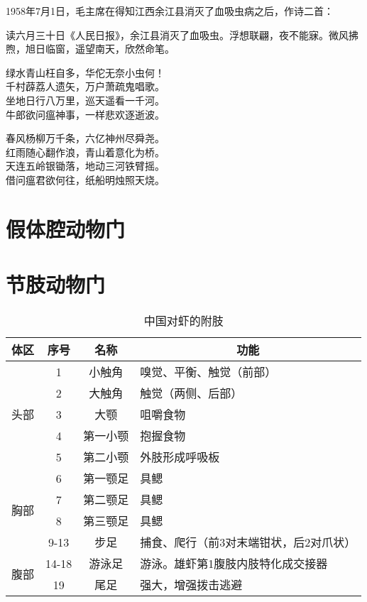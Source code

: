 \begin{gs}
	1958年7月1日，毛主席在得知江西余江县消灭了血吸虫病之后，作诗二首：

	\mbox{}

	\fangsong
	\hspace{2em} 读六月三十日《人民日报》，余江县消灭了血吸虫。浮想联翩，夜不能寐。微风拂煦，旭日临窗，遥望南天，欣然命笔。
	\begin{center}
		\kaishu
		绿水青山枉自多，华佗无奈小虫何！\\
		千村薜荔人遗矢，万户萧疏鬼唱歌。\\
		坐地日行八万里，巡天遥看一千河。\\
		牛郎欲问瘟神事，一样悲欢逐逝波。\\

		\mbox{}

		春风杨柳万千条，六亿神州尽舜尧。\\
		红雨随心翻作浪，青山着意化为桥。\\
		天连五岭银锄落，地动三河铁臂摇。\\
		借问瘟君欲何往，纸船明烛照天烧。\\

	\end{center}
\end{gs}

\section{假体腔动物门}

\section{节肢动物门}

\begin{table}[htbp]
	\centering
	\begin{tabularx}{\textwidth}{|c|c|c|X|}
		\hline
		体区 & 序号 & 名称 & \multicolumn{1}{c|}{功能} \\ \hline
		\multirow{5}{*}{头部} & 1 & 小触角 & 嗅觉、平衡、触觉（前部） \\ \cline{2-4}
		& 2 & 大触角 & 触觉（两侧、后部） \\ \cline{2-4}
		& 3 & 大颚 & 咀嚼食物 \\ \cline{2-4}
		& 4 & 第一小颚 & 抱握食物 \\ \cline{2-4}
		& 5 & 第二小颚 & 外肢形成呼吸板 \\ \hline
		\multirow{4}{*}{胸部} & 6 & 第一颚足 & 具鳃 \\ \cline{2-4}
		& 7 & 第二颚足 & 具鳃 \\ \cline{2-4}
		& 8 & 第三颚足 & 具鳃 \\ \cline{2-4}
		& 9-13 & 步足 & 捕食、爬行（前3对末端钳状，后2对爪状） \\ \hline
		\multirow{2}{*}{腹部} & 14-18 & 游泳足 & 游泳。雄虾第1腹肢内肢特化成交接器 \\ \cline{2-4}
		& 19 & 尾足 & 强大，增强拨击逃避 \\ \hline
	\end{tabularx}
	\caption{中国对虾的附肢}
	\label{tab:AppendagesOfChineseShrimp}
\end{table}

